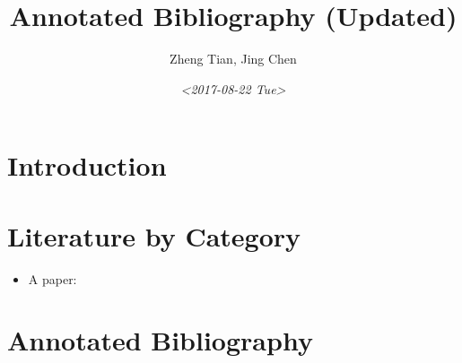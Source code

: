 \documentclass[a4paper,11pt]{article}
\author{Zheng Tian, Jing Chen}
\date{\textit{<2017-08-22 Tue>}}
\title{Annotated Bibliography (Updated)}
\begin{document}
\maketitle


\section{Introduction \label{introduction}}
\label{sec:org26b27ab}

\section{Literature by Category \label{lit_category}}
\label{sec:orgfcf6489}

\begin{itemize}
\item A paper: \cite{Simmie2003}
\end{itemize}

\section{Annotated Bibliography \label{annotated_bib}}
\label{sec:org8457eae}




\end{document}
